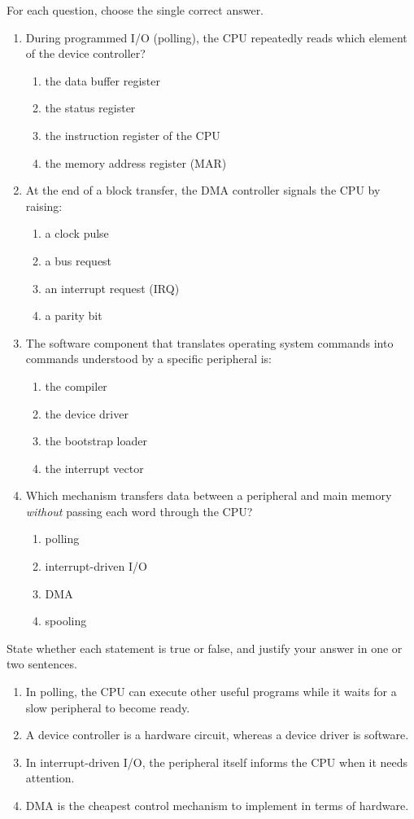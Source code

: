 \documentclass[11pt]{article}
\newcommand{\cle}[1]{{\popxbold\color{popdark}#1}}
\begin{document}
\begin{exercice}
For each question, choose the single correct answer.
\begin{enumerate}
\item During \cle{programmed I/O (polling)}, the CPU repeatedly reads which element of the device controller?
\begin{enumerate}
\item the data buffer register
\item the status register
\item the instruction register of the CPU
\item the memory address register (MAR)
\end{enumerate}
\item At the end of a block transfer, the DMA controller signals the CPU by raising:
\begin{enumerate}
\item a clock pulse
\item a bus request
\item an interrupt request (IRQ)
\item a parity bit
\end{enumerate}
\item The software component that translates operating system commands into commands understood by a specific peripheral is:
\begin{enumerate}
\item the compiler
\item the device driver
\item the bootstrap loader
\item the interrupt vector
\end{enumerate}
\item Which mechanism transfers data between a peripheral and main memory \emph{without} passing each word through the CPU?
\begin{enumerate}
\item polling
\item interrupt-driven I/O
\item DMA
\item spooling
\end{enumerate}
\end{enumerate}
\end{exercice}

\begin{exercice}
State whether each statement is true or false, and justify your answer in one or two sentences.
\begin{enumerate}
\item In polling, the CPU can execute other useful programs while it waits for a slow peripheral to become ready.
\item A device controller is a hardware circuit, whereas a device driver is software.
\item In interrupt-driven I/O, the peripheral itself informs the CPU when it needs attention.
\item DMA is the cheapest control mechanism to implement in terms of hardware.
\end{enumerate}
\end{exercice}
\end{document}
